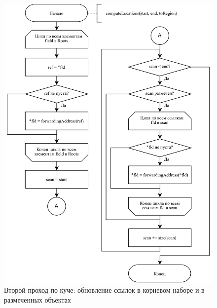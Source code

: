 \begin{figure}[H]
	\centering
	\includegraphics[scale=0.175]{assets/mark-compact-3.png}
	\caption{Второй проход по куче: обновление ссылок в корневом наборе и в размеченных объектах}
	\label{fig:mark-compact-3}
\end{figure}


